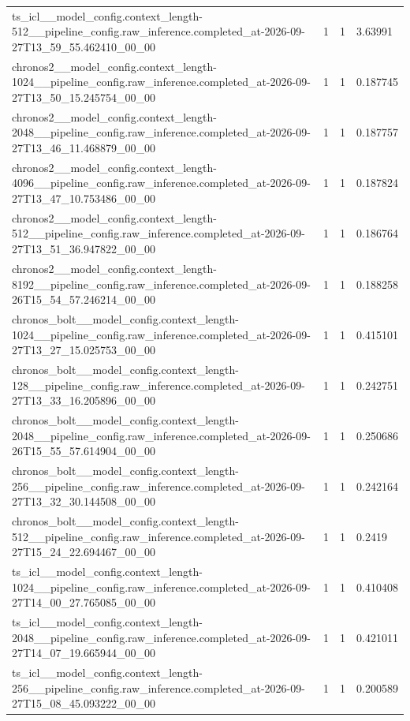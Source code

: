 \begin{tabular}{llll}
ts\_icl\_\_model\_config.context\_length-512\_\_pipeline\_config.raw\_inference.completed\_at-2026-09-27T13\_59\_55.462410\_00\_00 & 1 & 1 & 3.63991 \\
chronos2\_\_model\_config.context\_length-1024\_\_pipeline\_config.raw\_inference.completed\_at-2026-09-27T13\_50\_15.245754\_00\_00 & 1 & 1 & 0.187745 \\
chronos2\_\_model\_config.context\_length-2048\_\_pipeline\_config.raw\_inference.completed\_at-2026-09-27T13\_46\_11.468879\_00\_00 & 1 & 1 & 0.187757 \\
chronos2\_\_model\_config.context\_length-4096\_\_pipeline\_config.raw\_inference.completed\_at-2026-09-27T13\_47\_10.753486\_00\_00 & 1 & 1 & 0.187824 \\
chronos2\_\_model\_config.context\_length-512\_\_pipeline\_config.raw\_inference.completed\_at-2026-09-27T13\_51\_36.947822\_00\_00 & 1 & 1 & 0.186764 \\
chronos2\_\_model\_config.context\_length-8192\_\_pipeline\_config.raw\_inference.completed\_at-2026-09-26T15\_54\_57.246214\_00\_00 & 1 & 1 & 0.188258 \\
chronos\_bolt\_\_model\_config.context\_length-1024\_\_pipeline\_config.raw\_inference.completed\_at-2026-09-27T13\_27\_15.025753\_00\_00 & 1 & 1 & 0.415101 \\
chronos\_bolt\_\_model\_config.context\_length-128\_\_pipeline\_config.raw\_inference.completed\_at-2026-09-27T13\_33\_16.205896\_00\_00 & 1 & 1 & 0.242751 \\
chronos\_bolt\_\_model\_config.context\_length-2048\_\_pipeline\_config.raw\_inference.completed\_at-2026-09-26T15\_55\_57.614904\_00\_00 & 1 & 1 & 0.250686 \\
chronos\_bolt\_\_model\_config.context\_length-256\_\_pipeline\_config.raw\_inference.completed\_at-2026-09-27T13\_32\_30.144508\_00\_00 & 1 & 1 & 0.242164 \\
chronos\_bolt\_\_model\_config.context\_length-512\_\_pipeline\_config.raw\_inference.completed\_at-2026-09-27T15\_24\_22.694467\_00\_00 & 1 & 1 & 0.2419 \\
ts\_icl\_\_model\_config.context\_length-1024\_\_pipeline\_config.raw\_inference.completed\_at-2026-09-27T14\_00\_27.765085\_00\_00 & 1 & 1 & 0.410408 \\
ts\_icl\_\_model\_config.context\_length-2048\_\_pipeline\_config.raw\_inference.completed\_at-2026-09-27T14\_07\_19.665944\_00\_00 & 1 & 1 & 0.421011 \\
ts\_icl\_\_model\_config.context\_length-256\_\_pipeline\_config.raw\_inference.completed\_at-2026-09-27T15\_08\_45.093222\_00\_00 & 1 & 1 & 0.200589 \\

\end{tabular}
